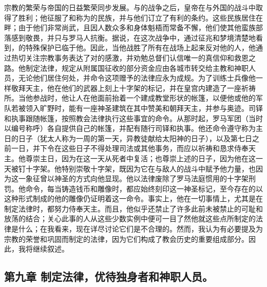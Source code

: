 宗教的繁荣与帝国的日益繁荣同步发展。与的战争之后，皇帝在与外国的战斗中取得了胜利；他征服了和称为的民族，并与他们订立了有利的条约。这些民族居住在畔；由于他们非常尚武，且因人数众多和身体魁梧而常备不懈，他们使其他蛮族部落感到敬畏，并只与罗马人抗衡。据说，在这次战争中，通过征兆和梦境清楚地看到，的特殊保护已临于他。因此，当他战胜了所有在战场上起来反对他的人，他通过热切关注宗教事务表达了对的感激，并劝勉总督们认信唯一的真信仰和救恩之路。他制定法律，规定从附属国征收的部分资金应由各城市转交给主教和神职人员，无论他们居住何处，并命令这项赠予的法律应永为成规。为了训练士兵像他一样敬拜天主，他在他们的武器上刻上十字架的标记，并在皇宫内建造了一座祈祷所。当他参战时，他让人在他面前抬着一个建成教堂形状的帐篷，以便他或他的军队若被领入旷野时，能有一座神圣建筑在其中赞美和朝拜天主，并参与奥迹。司铎和执事跟随帐篷，按照教会法律执行这些事宜的命令。从那时起，罗马军团（当时以编号称呼）各自提供自己的帐篷，并配有随行司铎和执事。他还命令遵守称为主日的日子（犹太人称为一周的第一天，异教徒献给太阳神的日子），以及第七日之前一日，并下令在这些日子不得处理司法或其他事务，而应以祈祷和恳求侍奉天主。他尊崇主日，因为在这一天从死者中复活；也尊崇上述的日子，因为他在这一天被钉十字架。他特别崇敬十字架，既因为它在与敌人的战斗中赋予他力量，也因为这一象征曾以神圣的方式向他显现。他以法律废除了罗马法庭惯用的十字架刑罚。他命令，每当铸造钱币和雕像时，都应始终刻印这一神圣标记，至今存在的以这种形式制成的他的雕像仍证明着这一命令。事实上，他在一切事情上，尤其是在制定法律时，都努力侍奉天主。而且，他似乎还禁止了许多此前未被禁止的可耻和放荡的结合；关心此事的人从这些少数实例中便可一目了然他就这些点所制定的法律是什么；在我看来，现在详尽讨论它们是不合理的。然而，我认为有必要提及为宗教的荣誉和巩固而制定的法律，因为它们构成了教会历史的重要组成部分。因此，我将继续叙述。\par


\subsection{第九章 制定法律，优待独身者和神职人员。}

